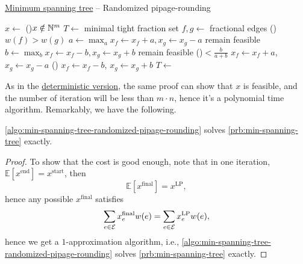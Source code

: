 \begin{algorithm}[H]\label{algo:min-spanning-tree-randomized-pipage-rounding}
	\DontPrintSemicolon
	\caption{\hyperref[prb:min-spanning-tree]{Minimum spanning tree} -- Randomized pipage-rounding}
	\BlankLine
	\(x\gets\)
	\;
	\While(){\(x \notin \mathbb{\MakeUppercase{n}} ^{m}\)}{
		\(T\gets\) minimal tight fraction set
		\(f, g\gets \) fractional edges\label{algo:min-spanning-tree-randomized-pipage-rounding-fg}
		\If(){\(w(f) > w(g)\)}{
			\;
		}
		\(a\gets \max_a x_f \gets x_f + a, x_g \gets x_g - a\) remain feasible
		\(b\gets \max_b x_f \gets x_f - b, x_g \gets x_g + b\) remain feasible
		\uIf(){\(< \frac{b}{a + b}\)}{
			\(x_f \gets x_f + a\), \(x_g \gets x_g - a\)\;
		}\Else(){
			\(x_f \gets x_f - b\), \(x_g \gets x_g + b\)\;
		}
	}
	\;
	\(T\gets\)
	\;
\end{algorithm}

As in the \hyperref[algo:min-spanning-tree-pipage-rounding]{deterministic version}, the same proof can show that \(x\) is feasible, and the number of iteration will be less than \(m \cdot n\), hence it's a polynomial time algorithm. Remarkably, we have the following.

\begin{theorem}
	\autoref{algo:min-spanning-tree-randomized-pipage-rounding} solves \autoref{prb:min-spanning-tree} exactly.
\end{theorem}
\begin{proof}
	To show that the cost is good enough, note that in one iteration, \(\mathbb{E}\left[x^{\text{end} } \right] = x^{\text{start} }\), then
	\[
		\mathbb{E}\left[ x^{\text{final}} \right] = x^{\text{LP} },
	\]
	hence any possible \(x^{\text{final} }\) satisfies
	\[
		\sum_{e\in \mathcal{\MakeUppercase{e}} } x^{\text{final}}_e w(e)= \sum_{e\in \mathcal{\MakeUppercase{e}} } x_e^{\text{LP}} w(e),
	\]
	hence we get a \(1\)-approximation algorithm, i.e., \autoref{algo:min-spanning-tree-randomized-pipage-rounding} solves \autoref{prb:min-spanning-tree} exactly.
\end{proof}

